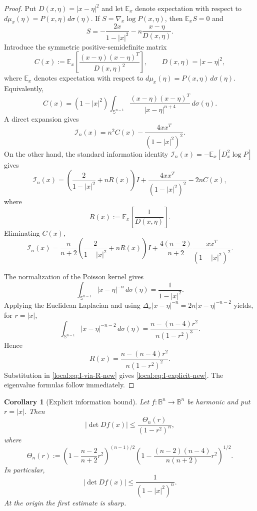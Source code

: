 \documentclass[11pt,reqno]{amsart}
\newtheorem{corollary}[theorem]{Corollary}
\theoremstyle{remark}
\newcommand{\B}{\mathbb B}
\newcommand{\Sph}{\mathbb S}
\begin{document}
\begin{proof}
Put $D(x,\eta)=|x-\eta|^2$ and let $\mathbb E_x$ denote expectation with
respect to $d\mu_x(\eta)=P(x,\eta)d\sigma(\eta)$.  If
$S=\nabla_x\log P(x,\eta)$, then $\mathbb E_xS=0$ and
\[
 S
 =
 -\frac{2x}{1-|x|^2}
 -n\frac{x-\eta}{D(x,\eta)}.
\] 
Introduce the symmetric positive-semidefinite matrix
\[
 C(x)
 :=
 \mathbb E_x
 \left[
 \frac{(x-\eta)(x-\eta)^T}{D(x,\eta)^2}
 \right],
 \qquad D(x,\eta)=|x-\eta|^2,
\]
where \(\mathbb E_x\) denotes expectation with respect to
\(d\mu_x(\eta)=P(x,\eta)\,d\sigma(\eta)\). Equivalently,
\[
 C(x)
 =
 (1-|x|^2)
 \int_{\Sph^{n-1}}
 \frac{(x-\eta)(x-\eta)^T}{|x-\eta|^{n+4}}
 \,d\sigma(\eta).
\]
A direct expansion gives
\begin{equation}\label{local:eq:I-via-C-new}
 \mathcal I_n(x)
 =
 n^2C(x)-\frac{4xx^T}{(1-|x|^2)^2}.
\end{equation}
On the other hand, the standard information identity
$\mathcal I_n(x)=-\mathbb E_x[D_x^2\log P]$ gives
\[
 \mathcal I_n(x)
 =
 \left(
 \frac{2}{1-|x|^2}+nR(x)
 \right)I
 +\frac{4xx^T}{(1-|x|^2)^2}
 -2nC(x),
\]
where
\[
 R(x)
 :=
 \mathbb E_x\left[\frac1{D(x,\eta)}\right].
\]
Eliminating $C(x)$,
\begin{equation}\label{local:eq:I-via-R-new}
 \mathcal I_n(x)
 =
 \frac{n}{n+2}
 \left(
 \frac{2}{1-|x|^2}+nR(x)
 \right)I
 +
 \frac{4(n-2)}{n+2}
 \frac{xx^T}{(1-|x|^2)^2}.
\end{equation}

The normalization of the Poisson kernel gives
\[
 \int_{\Sph^{n-1}}|x-\eta|^{-n}\,d\sigma(\eta)
 =
 \frac1{1-|x|^2}.
\]
Applying the Euclidean Laplacian and using
$\Delta_x|x-\eta|^{-n}=2n|x-\eta|^{-n-2}$ yields, for $r=|x|$,
\[
 \int_{\Sph^{n-1}}|x-\eta|^{-n-2}\,d\sigma(\eta)
 =
 \frac{n-(n-4)r^2}{n(1-r^2)^3}.
\]
Hence
\[
 R(x)
 =
 \frac{n-(n-4)r^2}{n(1-r^2)^2}.
\]
Substitution in \eqref{local:eq:I-via-R-new} gives
\eqref{local:eq:I-explicit-new}.  The eigenvalue formulas follow immediately.
\end{proof}

\begin{corollary}[Explicit information bound]
\label{local:cor:euclidean-jacobian}
Let $f:\B^n\to\B^n$ be harmonic and put $r=|x|$.  Then
\begin{equation}\label{local:eq:Theta-bound-new}
 |\det Df(x)|
 \le
 \frac{\Theta_n(r)}{(1-r^2)^n},
\end{equation}
where
\begin{equation}\label{local:eq:Theta-definition-new}
 \Theta_n(r)
 :=
 \left(1-\frac{n-2}{n+2}r^2\right)^{(n-1)/2}
 \left(
 1-\frac{(n-2)(n-4)}{n(n+2)}r^2
 \right)^{1/2}.
\end{equation}
In particular,
\begin{equation}\label{local:eq:simple-euclidean-bound-new}
 |\det Df(x)|
 \le
 \frac1{(1-|x|^2)^n}.
\end{equation}
At the origin the first estimate is sharp.
\end{corollary}
\end{document}
